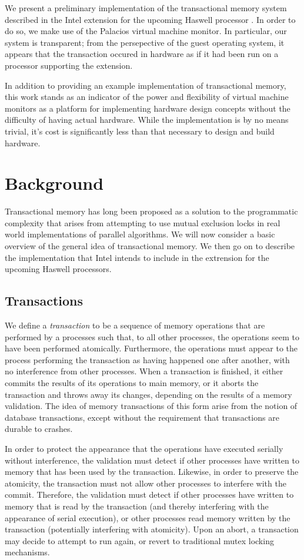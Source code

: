 \documentclass{acm_proc_article-sp}
\begin{document}
We present a preliminary implementation of the transactional memory system 
described in the Intel extension for the upcoming Haswell processor \cite{intelsys}.
In order to do so, we make use of the Palacios virtual machine monitor. In
particular, our system is transparent; from the persepective of the guest
operating system, it appears that the transaction occured in hardware as if it
had been run on a processor supporting the extension. 

In addition to providing an example implementation of transactional memory,
this work stands as an indicator of the power and flexibility of virtual machine 
monitors as a platform for implementing hardware design concepts without the 
difficulty of having actual hardware. While the implementation is by no means
trivial, it's cost is significantly less than that necessary to design and 
build hardware.  

\section{Background}
Transactional memory has long been proposed as a solution to the programmatic 
complexity that arises from attempting to use mutual exclusion locks in real world 
implementations of parallel algorithms. We will now consider a basic overview 
of the general idea of transactional memory. We then go on to describe the
 implementation that Intel intends to include in the extrension for the upcoming 
 Haswell processors.

\subsection{Transactions}
We define a \emph{transaction} to be a sequence of memory operations that are 
performed by a processes such that, to all other processes, the operations 
seem to have been performed atomically. Furthermore, the operations must 
appear to the process performing the transaction as having happened one after 
another, with no interference from other processes. When a transaction is finished,
it either commits the results of its operations to main memory, or it aborts 
the transaction and throws away its changes, depending on the results of a
memory validation. The idea of memory transactions of this form arise from the
notion of database transactions, except without the requirement that transactions
are durable to crashes. 

In order to protect the appearance that the operations have executed serially
without interference, the validation must detect if other processes have 
written to memory that has been used by the transaction. Likewise, in order
to preserve the atomicity, the transaction must not allow other processes
to interfere with the commit. Therefore, the validation must detect if 
other processes have written to memory that is read by the transaction 
(and thereby interfering with the appearance of serial execution), or other 
processes read memory written by the transaction (potentially interfering
with atomicity). Upon an abort, a transaction may decide to attempt to run 
again, or revert to traditional mutex locking mechanisms.~\cite{Herlihy:1993:TMA:173682.165164}
\end{document}
